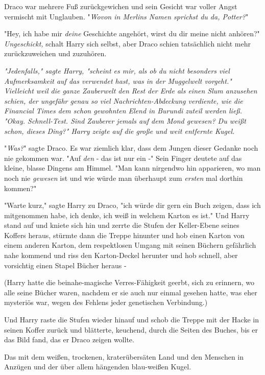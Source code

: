 {Draco war mehrere Fuß zurückgewichen und sein Gesicht war voller Angst vermischt mit Unglauben. "\emph{Wovon in Merlins Namen sprichst du da, Potter?}"

"Hey, ich habe mir \emph{deine} Geschichte angehört, wirst du dir meine nicht anhören?" \emph{Ungeschickt,} schalt Harry sich selbst, aber Draco schien tatsächlich nicht mehr zurückzuweichen und zuzuhören.

\emph{"Jedenfalls," sagte Harry, "scheint es mir, als ob du nicht besonders viel Aufmerksamkeit auf das verwendet hast, was in der Muggelwelt vorgeht." Vielleicht weil die ganze Zauberwelt den Rest der Erde als einen Slum anzusehen schien, der ungefähr genau so viel Nachrichten-Abdeckung verdiente, wie die \emph{Financial Times} dem schon gewohnten Elend in Burundi zuteil werden ließ. "Okay. Schnell-Test. Sind Zauberer jemals auf dem Mond gewesen? Du weißt schon, dieses Ding?" Harry zeigte auf die große und weit entfernte Kugel.}

"\emph{Was?}" sagte Draco. Es war ziemlich klar, dass dem Jungen dieser Gedanke noch nie gekommen war. "Auf \emph{den} - das ist nur ein -" Sein Finger deutete auf das kleine, blasse Dingens am Himmel. "Man kann nirgendwo hin apparieren, wo man noch nie \emph{gewesen} ist und wie würde man überhaupt zum \emph{ersten} mal dorthin kommen?"

"Warte kurz," sagte Harry zu Draco, "ich würde dir gern ein Buch zeigen, dass ich mitgenommen habe, ich denke, ich weiß in welchem Karton es ist." Und Harry stand auf und kniete sich hin und zerrte die Stufen der Keller-Ebene seines Koffers heraus, stürmte dann die Treppe hinunter und hob einen Karton von einem anderen Karton, dem respektlosen Umgang mit seinen Büchern gefährlich nahe kommend und riss den Karton-Deckel herunter und hob schnell, aber vorsichtig einen Stapel Bücher heraus -

(Harry hatte die beinahe-magische Verres-Fähigkeit geerbt, sich zu erinnern, wo alle seine Bücher waren, nachdem er sie auch nur einmal gesehen hatte, was eher mysteriös war, wegen des Fehlens jeder genetischen Verbindung.)

Und Harry raste die Stufen wieder hinauf und schob die Treppe mit der Hacke in seinen Koffer zurück und blätterte, keuchend, durch die Seiten des Buches, bis er das Bild fand, das er Draco zeigen wollte.

Das mit dem weißen, trockenen, kraterübersäten Land und den Menschen in Anzügen und der über allem hängenden blau-weißen Kugel.

}
